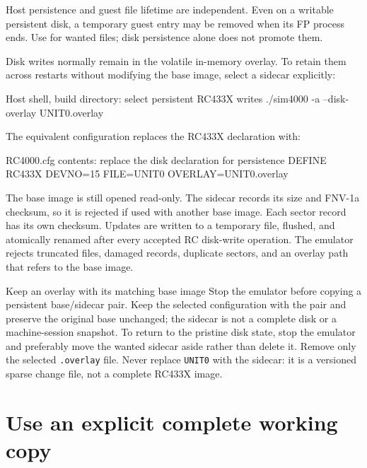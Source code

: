 Host persistence and guest file lifetime are independent. Even on a writable persistent disk, a temporary guest entry may be removed when its FP process ends. Use  for wanted files; disk persistence alone does not promote them.

Disk writes normally remain in the volatile in-memory overlay. To retain them across restarts without modifying the base image, select a sidecar explicitly:

\begin{commandexample}[language=sh]{Host shell, build directory: select persistent RC433X writes}
./sim4000 -a --disk-overlay UNIT0.overlay
\end{commandexample}

The equivalent configuration replaces the RC433X declaration with:

\begin{commandexample}{RC4000.cfg contents: replace the disk declaration for persistence}
DEFINE RC433X DEVNO=15 FILE=UNIT0 OVERLAY=UNIT0.overlay
\end{commandexample}

The base image is still opened read-only. The sidecar records its size and FNV-1a checksum, so it is rejected if used with another base image. Each sector record has its own checksum. Updates are written to a temporary file, flushed, and atomically renamed after every accepted RC disk-write operation. The emulator rejects truncated files, damaged records, duplicate sectors, and an overlay path that refers to the base image.

\begin{operationnote}{Keep an overlay with its matching base image}
Stop the emulator before copying a persistent base/sidecar pair. Keep the selected configuration with the pair and preserve the original base unchanged; the sidecar is not a complete disk or a machine-session snapshot. To return to the pristine disk state, stop the emulator and preferably move the wanted sidecar aside rather than delete it. Remove only the selected \passthrough{\lstinline!.overlay!} file. Never replace \passthrough{\lstinline!UNIT0!} with the sidecar: it is a versioned sparse change file, not a complete RC433X image.
\end{operationnote}

\section{Use an explicit complete working copy}\label{use-an-explicit-complete-working-copy}

